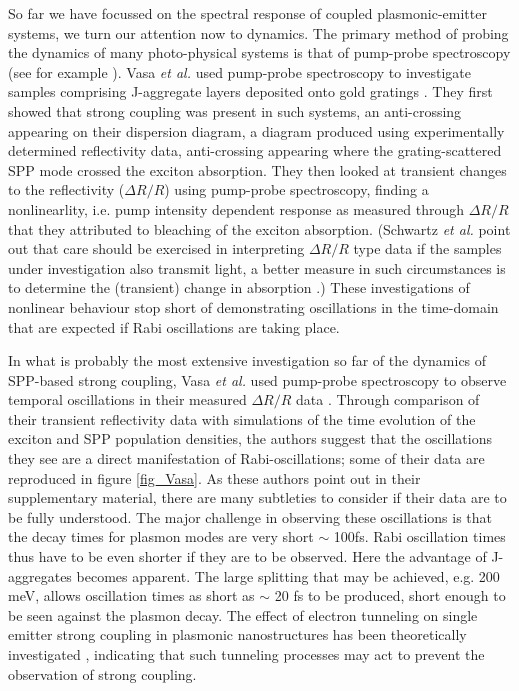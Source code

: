\documentclass[12pt]{iopart}
\begin{document}
So far we have focussed on the spectral response of coupled plasmonic-emitter systems, we turn our attention now to dynamics. The primary method of probing the dynamics of many photo-physical systems is that of pump-probe spectroscopy (see for example \cite{Ulbricht_RMP_2011_83_543}). Vasa {\it et al.} used pump-probe spectroscopy to investigate samples comprising J-aggregate layers deposited onto gold gratings \cite{Vasa2010}. They first showed that strong coupling was present in such systems, an anti-crossing appearing on their dispersion diagram, a diagram produced using experimentally determined reflectivity data, anti-crossing appearing where the grating-scattered SPP mode crossed the exciton absorption. They then looked at transient changes to the reflectivity ($\Delta R/R$) using pump-probe spectroscopy, finding a nonlinearlity, i.e. pump intensity dependent response as measured through $\Delta R/R$ that they attributed to bleaching of the exciton absorption. (Schwartz {\it et al.} point out that care should be exercised in interpreting $\Delta R/R$ type data if the samples under investigation also transmit light, a better measure in such circumstances is to determine the (transient) change in absorption \cite{Schwartz2013}.) These investigations of nonlinear behaviour stop short of demonstrating oscillations in the time-domain that are expected if Rabi oscillations are taking place.

In what is probably the most extensive investigation so far of the dynamics of SPP-based strong coupling, Vasa {\it et al.} used pump-probe spectroscopy to observe temporal oscillations in their measured $\Delta R/R$ data \cite{Vasa2013}. Through comparison of their transient reflectivity data with simulations of the time evolution of the exciton and SPP population densities, the authors suggest that the oscillations they see are a direct manifestation of Rabi-oscillations; some of their data are reproduced in figure \ref{fig_Vasa}. As these authors point out in their supplementary material, there are many subtleties to consider if their data are to be fully understood. The major challenge in observing these oscillations is that the decay times for plasmon modes are very short $\sim$ 100fs. Rabi oscillation times thus have to be even shorter if they are to be observed. Here the advantage of J-aggregates becomes apparent. The large splitting that may be achieved, e.g. 200 meV, allows oscillation times as short as $\sim$ 20 fs to be produced, short enough to be seen against the plasmon decay. The effect of electron tunneling on single emitter strong coupling in plasmonic nanostructures has been theoretically investigated \cite{Marinica2013}, indicating that such tunneling processes may act to prevent the observation of strong coupling.\\
\end{document}
